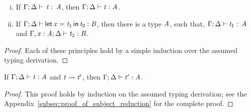 \begin{lemma}[Inversion]
\begin{enumerate}[i.]
  \item If $\Gamma  ;  \Delta  \vdash  \relax \, \mathit{t}  :  \relax \, \mathit{A}$, then $\Gamma  ;  \Delta  \vdash  \mathit{t}  :  \mathit{A}$.
  \item If $\Gamma  ;  \Delta  \vdash   \mathsf{let}\,\relax  \mathit{x}  =  \mathit{t_{{\mathrm{1}}}} \,\mathsf{in}\, \mathit{t_{{\mathrm{2}}}}   :  \mathit{B}$, then there is a type $\mathit{A}$, such that,
    $\Gamma  ;  \Delta  \vdash  \mathit{t_{{\mathrm{1}}}}  :  \relax \, \mathit{A}$ and $\Gamma  ,  \mathit{x}  :  \mathit{A}  ;  \Delta  \vdash  \mathit{t_{{\mathrm{2}}}}  :  \mathit{B}$.
  \end{enumerate}
\end{lemma}
\begin{proof}
  Each of these principles hold by a simple induction over the assumed
  typing derivation.
\end{proof}

\begin{lemma}
  \label{lemma:subject_reduction}
  If $\Gamma  ;  \Delta  \vdash  \mathit{t}  :  \mathit{A}$ and $\mathit{t}  \rightsquigarrow  \mathit{t'}$, then $\Gamma  ;  \Delta  \vdash  \mathit{t'}  :  \mathit{A}$.
\end{lemma}
\begin{proof}
  This proof holds by induction on the assumed typing derivation; see
  the Appendix~\ref{subsec:proof_of_subject_reduction} for the
  complete proof.
\end{proof}
